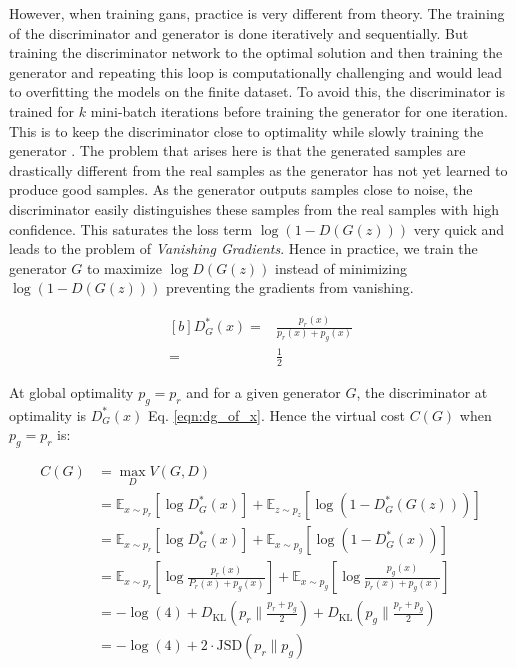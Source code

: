 However, when training \acp{gan}, practice is very different from theory. The training of the discriminator and generator is done iteratively and sequentially. But training the discriminator network to the optimal solution and then training the generator and repeating this loop is computationally challenging and would lead to overfitting the models on the finite dataset. To avoid this, the discriminator is trained for $k$ mini-batch iterations before training the generator for one iteration. This is to keep the discriminator close to optimality while slowly training the generator \cite{goodfellow2014generative}. The problem that arises here is that the generated samples are drastically different from the real samples as the generator has not yet learned to produce good samples. As the generator outputs samples close to noise, the discriminator easily distinguishes these samples from the real samples with high confidence. This saturates the loss term $\log (1-D(G(z)))$ very quick and leads to the problem of \textit{Vanishing Gradients}. Hence in practice, we train the generator $G$ to maximize $\log D(G(z))$ instead of minimizing $\log (1-D(G(z)))$ preventing the gradients from vanishing.

\begin{equation} \label{eqn:dg_of_x}
    \begin{aligned}[b]
        D_{G}^*(x) = & \frac{p_{r}(x)}{p_{r}(x)+p_{g}(x)} \\
        =            & \frac{1}{2}
    \end{aligned}
\end{equation}

At global optimality $p_{g}=p_{r}$ and for a given generator $G$, the discriminator at optimality is $D_{G}^*(x)$ Eq. \ref{eqn:dg_of_x}. Hence the virtual cost $C(G)$ \cite{goodfellow2014generative} when $p_{g}=p_{r}$ is:

\begin{equation} \label{eqn:c_of_g}
    \begin{aligned}
        C(G) & = \max _{D} V(G, D)                                                                                                                                          \\
             & =\mathbb{E}_{x \sim p_{r}}\left[\log D_{G}^{*}(x)\right]+\mathbb{E}_{z \sim p_{z}}\left[\log \left(1-D_{G}^{*}(G(z))\right)\right]                           \\
             & =\mathbb{E}_{x \sim p_{r}}\left[\log D_{G}^{*}(x)\right]+\mathbb{E}_{x \sim p_{g}}\left[\log \left(1-D_{G}^{*}(x)\right)\right]                              \\
             & =\mathbb{E}_{x \sim p_{r}}\left[\log \frac{p_{r}(x)}{P_{r}(x)+p_{g}(x)}\right]+\mathbb{E}_{x \sim p_{g}}\left[\log \frac{p_{g}(x)}{p_{r}(x)+p_{g}(x)}\right] \\
             & =-\log (4)+ D_{\mathrm{KL}}\left(p_{r} \| \frac{p_{r}+p_{g}}{2}\right)+D_{\mathrm{KL}}\left(p_{g} \| \frac{p_{r}+p_{g}}{2}\right)                            \\
             & =-\log(4) + 2 \cdot  \mathrm{JSD}(p_{r} \| p_{g})
    \end{aligned}
\end{equation}

